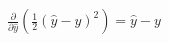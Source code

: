 \documentclass[preview]{standalone}
\begin{document}
\begin{align*}
\frac{\partial }{\partial \hat{y}} \left(\frac{1}{2}(\hat{y} - y )^2\right) = \hat{y} - y
\end{align*}
\end{document}
